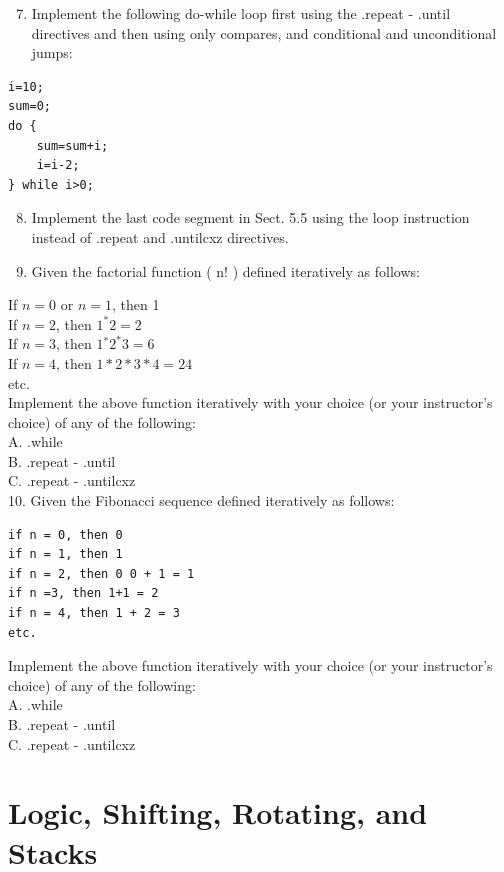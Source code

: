 \documentclass[10pt]{article}
\begin{document}
\begin{enumerate}
  \setcounter{enumi}{6}
  \item Implement the following do-while loop first using the .repeat - .until directives and then using only compares, and conditional and unconditional jumps:
\end{enumerate}

\begin{verbatim}
i=10;
sum=0;
do {
    sum=sum+i;
    i=i-2;
} while i>0;
\end{verbatim}

\begin{enumerate}
  \setcounter{enumi}{7}
  \item Implement the last code segment in Sect. 5.5 using the loop instruction instead of .repeat and .untilcxz directives.
  \item Given the factorial function ( $\mathrm{n}!$ ) defined iteratively as follows:
\end{enumerate}

If $n=0$ or $n=1$, then 1\\
If $n=2$, then $1^{*} 2=2$\\
If $n=3$, then $1{ }^{*} 2^{*} 3=6$\\
If $n=4$, then $1 * 2 * 3 * 4=24$\\
etc.\\
Implement the above function iteratively with your choice (or your instructor's choice) of any of the following:\\
A. .while\\
B. .repeat - .until\\
C. .repeat - .untilcxz\\
10. Given the Fibonacci sequence defined iteratively as follows:

\begin{verbatim}
if n = 0, then 0
if n = 1, then 1
if n = 2, then 0 0 + 1 = 1
if n =3, then 1+1 = 2
if n = 4, then 1 + 2 = 3
etc.
\end{verbatim}

Implement the above function iteratively with your choice (or your instructor's choice) of any of the following:\\
A. .while\\
B. .repeat - .until\\
C. .repeat - .untilcxz

\section*{Logic, Shifting, Rotating, and Stacks}
\end{document}

